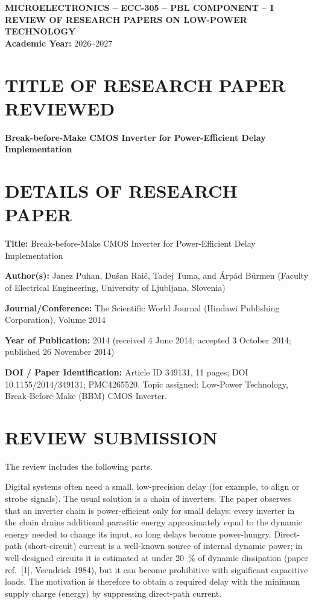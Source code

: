 \documentclass[11pt,a4paper]{article}
\begin{document}
\collegeheader

\begin{center}
  {\bfseries MICROELECTRONICS -- ECC-305 -- PBL COMPONENT -- I}\\[3pt]
  {\bfseries REVIEW OF RESEARCH PAPERS ON LOW-POWER TECHNOLOGY}\\[3pt]
  \textbf{Academic Year:} 2026--2027
\end{center}

\studentdetails
\evaluatorbox

\vspace{4pt}
\section*{\centering TITLE OF RESEARCH PAPER REVIEWED}
\begin{center}\textbf{Break-before-Make CMOS Inverter for Power-Efficient Delay Implementation}\end{center}

\section*{\centering DETAILS OF RESEARCH PAPER}
\textbf{Title:} Break-before-Make CMOS Inverter for Power-Efficient Delay Implementation

\textbf{Author(s):} Janez Puhan, Du\v{s}an Rai\v{c}, Tadej Tuma, and \'Arp\'ad B\H{u}rmen (Faculty of Electrical Engineering, University of Ljubljana, Slovenia)

\textbf{Journal/Conference:} The Scientific World Journal (Hindawi Publishing Corporation), Volume 2014

\textbf{Year of Publication:} 2014 (received 4 June 2014; accepted 3 October 2014; published 26 November 2014)

\textbf{DOI / Paper Identification:} Article ID 349131, 11 pages; DOI 10.1155/2014/349131; PMC4265520. Topic assigned: Low-Power Technology, Break-Before-Make (BBM) CMOS Inverter.

\newpage
\section*{\centering REVIEW SUBMISSION}
The review includes the following parts.

Digital systems often need a small, low-precision delay (for example, to align or strobe signals). The usual solution is a chain of inverters. The paper observes that an inverter chain is power-efficient only for small delays: every inverter in the chain drains additional parasitic energy approximately equal to the dynamic energy needed to change its input, so long delays become power-hungry. Direct-path (short-circuit) current is a well-known source of internal dynamic power; in well-designed circuits it is estimated at under \SI{20}{\percent} of dynamic dissipation (paper ref.~[1], Veendrick 1984), but it can become prohibitive with significant capacitive loads. The motivation is therefore to obtain a required delay with the minimum supply charge (energy) by suppressing direct-path current.
\end{document}
